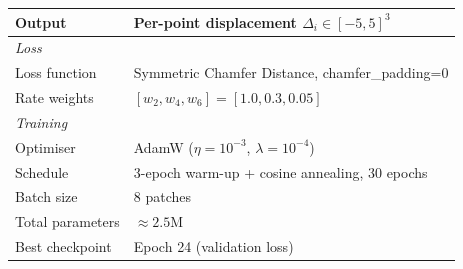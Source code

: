 \begin{table}[t]
\begin{tabular}{ll}
    Output & Per-point displacement $\Delta_i \in [-5, 5]^3$ \\
    \midrule
    \multicolumn{2}{l}{\textit{Loss}} \\
    Loss function & Symmetric Chamfer Distance, chamfer\_padding=0 \\
    Rate weights & $[w_2, w_4, w_6] = [1.0, 0.3, 0.05]$ \\
    \midrule
    \multicolumn{2}{l}{\textit{Training}} \\
    Optimiser & AdamW ($\eta = 10^{-3}$, $\lambda = 10^{-4}$) \\
    Schedule & 3-epoch warm-up + cosine annealing, 30 epochs \\
    Batch size & 8 patches \\
    Total parameters & $\approx 2.5\text{M}$ \\
    Best checkpoint & Epoch 24 (validation loss) \\
    \bottomrule
  \end{tabular}
\end{table}
